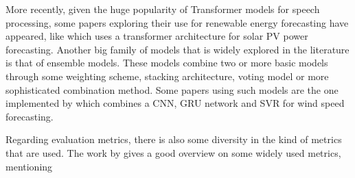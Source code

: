 More recently, given the huge popularity of Transformer models for speech processing, some papers exploring their use for renewable energy forecasting have appeared, like \cite{kim_obregon_park_jung_2024} which uses a transformer architecture for solar PV power forecasting.
Another big family of models that is widely explored in the literature is that of ensemble models. These models combine two or more basic models through some weighting scheme, stacking architecture, voting model or more sophisticated combination method. Some papers using such models are the one implemented by \cite{liu_mi_li_duan_xu_2019} which combines a CNN, GRU network and SVR for wind speed forecasting.

Regarding evaluation metrics, there is also some diversity in the kind of metrics that are used. The work by \cite{aristeidis_tjortjis_2024} gives a good overview on some widely used metrics, mentioning 
